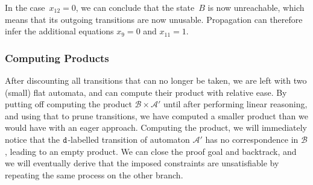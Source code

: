 In the case~$x_{12} = 0$, we can conclude
that the state~$B$ is now unreachable, which means that its outgoing transitions are now unusable. Propagation can
therefore infer the additional equations $x_9 = 0$ and $x_{11} = 1$.


\subsubsection{Computing Products}\label{sec:intuition:materialise}
After discounting all transitions that can no longer be taken, we are
left with two (small) flat automata, and can compute their product with
relative ease. By putting off computing the product $\mathcal{B} \times \mathcal{A}'$ until after
performing linear reasoning, and using that to prune transitions, we
have computed a smaller product than we would have with an eager
approach. Computing the product, we will immediately notice that the
$\texttt{d}$-labelled transition of automaton $\mathcal{A}'$ has no correspondence
in $\mathcal{B}$, leading to an empty product. We can close the proof goal and
backtrack, and we will eventually derive that the imposed constraints are
unsatisfiable by repeating the same process on the other branch.


